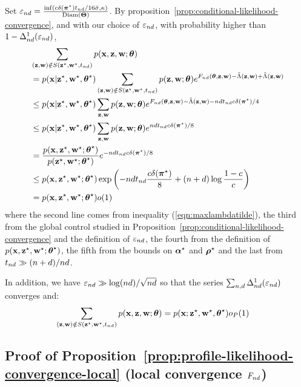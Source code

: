 Set $\varepsilon_{nd} = \frac{\inf( c\delta(\boldsymbol{\pi}^\star) t_{nd} / 16 \bar{\sigma}, \kappa)}{\operatorname{Diam}(\boldsymbol{\Theta})}$. By proposition~\ref{prop:conditional-likelihood-convergence}, and with our choice of $\varepsilon_{nd}$, 
with probability higher than $1 - \Delta_{nd}^1(\varepsilon_{nd})$,
\begin{align*}
  &\sum_{(\bz, \bw) \notin S(\bzs, \bws, \tnd)} \prob(\bx, \bz, \bw; \btheta)\\ 
  & = \prob(\bx| \bzs, \bws, \bthetas) \sum_{(\bz, \bw) \notin S(\bzs, \bws, \tnd)} \prob(\bz, \bw; \btheta) e^{\Fnd(\btheta, \bz, \bw) - \Lambtilde(\bz, \bw) + \Lambtilde(\bz, \bw)} \\
  & \leq \prob(\bx| \bzs, \bws, \bthetas) \sum_{\bz, \bw} \prob(\bz, \bw; \btheta) e^{\Fnd(\btheta, \bz, \bw) - \Lambtilde(\bz, \bw) - \n \dd \tnd c\delta(\bals) / 4} \\
  & \leq \prob(\bx| \bzs, \bws, \bthetas) \sum_{\bz, \bw} \prob(\bz, \bw; \btheta) e^{\n \dd \tnd c\delta(\bals) / 8} \\
  & = \frac{\prob(\bx, \bzs, \bws; \bthetas)}{\prob(\bzs, \bws; \bthetas)} e^{- \n \dd \tnd c\delta(\bals) / 8} \\
  & \leq \prob(\bx, \bzs, \bws; \bthetas) \exp\left( -\n\dd \tnd \frac{c\delta(\bals)}{8} + (\n+\dd)\log \frac{1-c}{c} \right) \\
  & = \prob(\bx, \bzs, \bws; \bthetas) \smallO(1)
\end{align*}
where the second line comes from inequality (\ref{eqn:maxlambdatilde}), the third from the global control studied in Proposition~\ref{prop:conditional-likelihood-convergence} and the definition of $\varepsilon_{nd}$, the fourth from the definition of $p(\mathbf{x}, \mathbf{z}^\star, \mathbf{w}^\star; \boldsymbol{\theta}^\star)$, the fifth from the bounds on $\boldsymbol{\alpha}^\star$ and $\boldsymbol{\rho}^\star$ and the last from $t_{nd} \gg (n+d)/nd$. 

In addition, we have $\varepsilon_{nd} \gg \log(nd) / \sqrt{nd}$ so that the series $\sum_{n, d} \Delta_{nd}^1(\varepsilon_{nd})$ converges and:
\begin{align*}
  \sum_{(\bz, \bw) \notin S(\bzs, \bws, \tnd)} \prob(\bx, \bz, \bw; \btheta) & = \prob(\bx; \bzs, \bws, \bthetas) \smallO_P(1)
\end{align*}
\proofend
  
\subsection{Proof of Proposition~\ref{prop:profile-likelihood-convergence-local} (local convergence $F_{nd}$)} 

